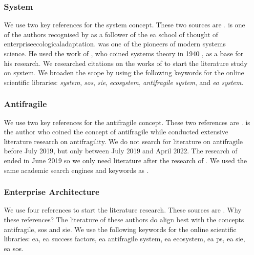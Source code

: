 \subsubsection{System}
\label{subsub:system}
We use two key references for the system concept. These two sources are \textcites{Ackoff1973}{Gharajedaghi2011}. \textcite{Gharajedaghi2011} is one of the authors recognised by \textcite{Lapalme2012} as a follower of the \gls{ea} school of thought of \gls{enterpriseecologicaladaptation}. \textcite{Ackoff1973} was one of the pioneers of modern systems science. He used the work of  \textcite{Bertalanffy1968}, who coined systems theory in 1940 \parencite{Systemstheory2022}, as a base for his research. We researched citations on the works of \textcites{Ackoff1973}{Gharajedaghi2011} to start the literature study on system. We broaden the scope by using the following keywords for the online scientific libraries: \textit{system}, \textit{\gls{sos}}, \textit{\gls{sie}}, \textit{ecosystem}, \textit{\gls{antifragile} system}, and \textit{\gls{ea} system}.

\subsubsection{Antifragile}
\label{subsub:antifragile}
We use two key references for the \gls{antifragile} concept. These two references are \textcites{Taleb2012}{Botjes2021}. \textcite{Taleb2012} is the author who coined the concept of \gls{antifragile} while \textcite{Botjes2021} conducted extensive literature research on \gls{antifragility}. We do not search for literature on \gls{antifragile} before July 2019, but only between July 2019 and April 2022. The research of \textcite{Botjes2021} ended in June 2019 so we only need literature after the research of \textcite{Botjes2021}. We used the same academic search engines and keywords as \textcite[p.~5]{Botjes2021}.

\subsubsection{Enterprise Architecture}
\label{subsub:enterprisearchitecture}
We use four references to start the literature research. These sources are \textcites{Dietz2008}{Graves2008}{Hoogervorst2009}{Lapalme2012b}. Why these references? The literature of these authors do align best with the concepts \gls{antifragile}, \gls{sos} and \gls{sie}. We use the following keywords for the online scientific libraries: \gls{ea}, \gls{ea} success factors, \gls{ea} \gls{antifragile} system, \gls{ea} ecosystem, \gls{ea} \gls{ps}, \gls{ea} \gls{sie}, \gls{ea} \gls{sos}.


